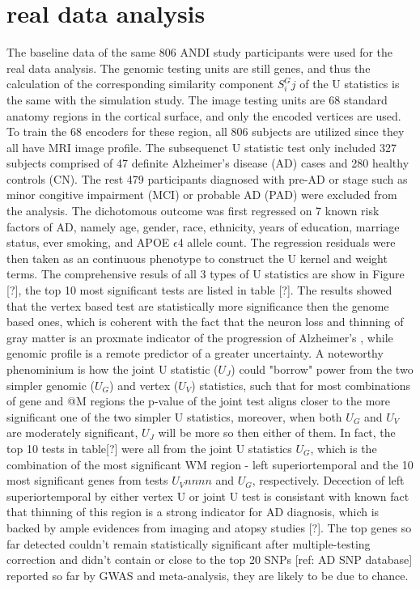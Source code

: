 \documentclass[twocolumn]{article}
\begin{document}
\section{real data analysis}
The baseline data of the same 806 ANDI study participants were used for the real data analysis. The genomic testing units are still genes, and thus the calculation of the corresponding similarity component $S^G_ij$ of the U statistics is the same with the simulation study. The image testing units are 68 standard anatomy regions in the cortical surface, and only the encoded vertices are used. To train the 68 encoders for these region, all 806 subjects are utilized since they all have MRI image profile. The subsequenct U statistic test only included 327 subjects comprised of 47 definite Alzheimer's disease (AD) cases and 280 healthy controls (CN). The rest 479 participants diagnosed with pre-AD or stage such as minor congitive impairment (MCI) or probable AD (PAD) were excluded from the analysis. The dichotomous outcome was first regressed on 7 known risk factors of AD, namely age, gender, race, ethnicity, years of education, marriage status, ever smoking, and APOE $\epsilon$4 allele count. The regression residuals were then taken as an continuous phenotype to construct the U kernel and weight terms. The comprehensive resuls of all 3 types of U statistics are show in Figure [?], the top 10 most significant tests are listed in table [?]. 
The results showed that the vertex based test are statistically more significance then the genome based ones, which is coherent with the fact that the neuron loss and thinning of gray matter is an proxmate indicator of the progression of Alzheimer's , while genomic profile is a remote predictor of a greater uncertainty. A noteworthy phenominium is how the joint U statistic ($U_J$) could "borrow" power from the two simpler genomic ($U_G$) and vertex ($U_V$) statistics, such that for most combinations of gene and @M regions the p-value of the joint test aligns closer to the more significant one of the two simpler U statistics, moreover, when both $U_G$ and $U_V$ are moderately significant, $U_J$ will be more so then either of them. In fact, the top 10 tests in table[?] were all from the joint U statistics $U_G$, which is the combination of the most significant WM region - left superiortemporal and the 10 most significant genes from tests $U_Vnnnn$ and $U_G$, respectively. Decection of left superiortemporal by either vertex U or joint U test is consistant with known fact that thinning of this region is a strong indicator for AD diagnosis, which is backed by ample evidences from imaging and atopsy studies [?]. The top genes so far detected couldn't remain statistically significant after multiple-testing correction and didn't contain or close to the top 20 SNPs [ref: AD SNP database] reported so far by GWAS and meta-analysis, they are likely to be due to chance. 
\end{document}
